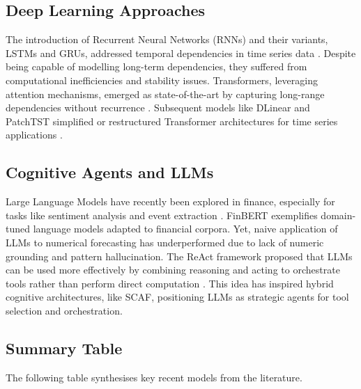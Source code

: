 \documentclass[conference]{IEEEtran}
\begin{document}
\subsection{Deep Learning Approaches}
The introduction of Recurrent Neural Networks (RNNs) and their variants, LSTMs and GRUs, addressed temporal dependencies in time series data \cite{hochreiter1997lstm}. Despite being capable of modelling long-term dependencies, they suffered from computational inefficiencies and stability issues. Transformers, leveraging attention mechanisms, emerged as state-of-the-art by capturing long-range dependencies without recurrence \cite{vaswani2017transformer}. Subsequent models like DLinear and PatchTST simplified or restructured Transformer architectures for time series applications \cite{zeng2022ltsflinear, nie2023patchtst}.

\subsection{Cognitive Agents and LLMs}
Large Language Models have recently been explored in finance, especially for tasks like sentiment analysis and event extraction \cite{huang2023finbertplus}. FinBERT exemplifies domain-tuned language models adapted to financial corpora. Yet, naive application of LLMs to numerical forecasting has underperformed due to lack of numeric grounding and pattern hallucination. The ReAct framework proposed that LLMs can be used more effectively by combining reasoning and acting to orchestrate tools rather than perform direct computation \cite{yao2022react}. This idea has inspired hybrid cognitive architectures, like SCAF, positioning LLMs as strategic agents for tool selection and orchestration.

\subsection{Summary Table}
The following table synthesises key recent models from the literature.
\end{document}
